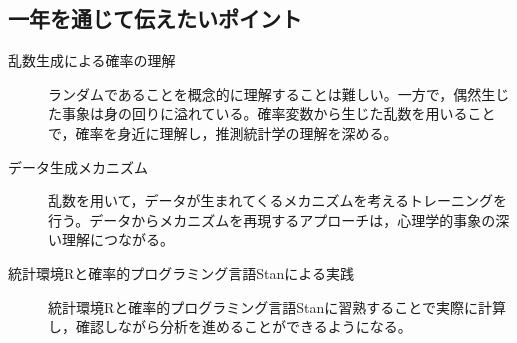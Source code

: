 \documentclass[dvipsnames]{ltjsarticle}
\begin{document}
\subsection*{一年を通じて伝えたいポイント}
\begin{description}
    \item[乱数生成による確率の理解] ランダムであることを概念的に理解することは難しい。一方で，偶然生じた事象は身の回りに溢れている。確率変数から生じた乱数を用いることで，確率を身近に理解し，推測統計学の理解を深める。
	\item[データ生成メカニズム] 乱数を用いて，データが生まれてくるメカニズムを考えるトレーニングを行う。データからメカニズムを再現するアプローチは，心理学的事象の深い理解につながる。
	\item[統計環境Rと確率的プログラミング言語Stanによる実践] 統計環境Rと確率的プログラミング言語Stanに習熟することで実際に計算し，確認しながら分析を進めることができるようになる。
\end{description}

% 
% 
\printbibliography[title=引用文献]
\end{document}
